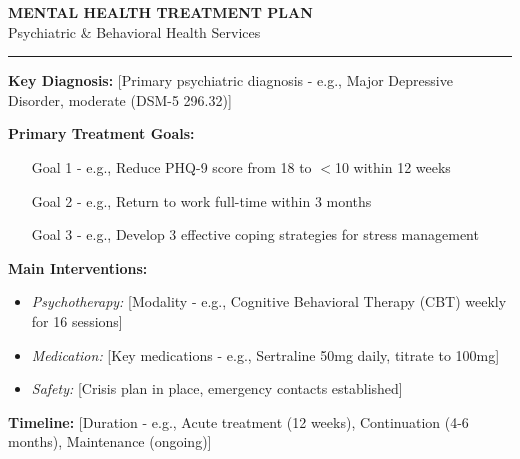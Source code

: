 \documentclass[11pt,letterpaper]{article}
\begin{document}
\begin{center}
{\Large\bfseries MENTAL HEALTH TREATMENT PLAN}\\[0.5em]
{\large Psychiatric \& Behavioral Health Services}\\[0.5em]
\rule{\textwidth}{1pt}
\end{center}

\vspace{1em}

\begin{tcolorbox}[colback=purple!5!white,colframe=purple!75!black,title=\textbf{TREATMENT PLAN HIGHLIGHTS},fonttitle=\bfseries\large]

\textbf{Key Diagnosis:} [Primary psychiatric diagnosis - e.g., Major Depressive Disorder, moderate (DSM-5 296.32)]

\vspace{0.3em}
\textbf{Primary Treatment Goals:}
\begin{itemize}[leftmargin=*,itemsep=0pt]
    \item [Goal 1 - e.g., Reduce PHQ-9 score from 18 to $<$10 within 12 weeks]
    \item [Goal 2 - e.g., Return to work full-time within 3 months]
    \item [Goal 3 - e.g., Develop 3 effective coping strategies for stress management]
\end{itemize}

\vspace{0.3em}
\textbf{Main Interventions:}
\begin{itemize}[leftmargin=*,itemsep=0pt]
    \item \textit{Psychotherapy:} [Modality - e.g., Cognitive Behavioral Therapy (CBT) weekly for 16 sessions]
    \item \textit{Medication:} [Key medications - e.g., Sertraline 50mg daily, titrate to 100mg]
    \item \textit{Safety:} [Crisis plan in place, emergency contacts established]
\end{itemize}

\vspace{0.3em}
\textbf{Timeline:} [Duration - e.g., Acute treatment (12 weeks), Continuation (4-6 months), Maintenance (ongoing)]

\end{tcolorbox}

\vspace{1em}
\end{document}
